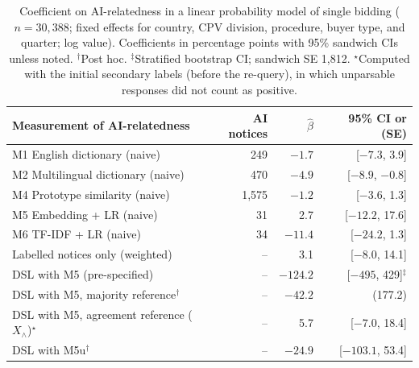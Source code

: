 \documentclass[runningheads]{llncs}
\begin{document}
\begin{table}[t]
\caption{Coefficient on AI-relatedness in a linear probability model of single bidding ($n=30{,}388$; fixed effects for country, CPV division, procedure, buyer type, and quarter; log value). Coefficients in percentage points with 95\% sandwich CIs unless noted. $^\dagger$Post hoc. $^\ddagger$Stratified bootstrap CI; sandwich SE 1,812. $^\star$Computed with the initial secondary labels (before the re-query), in which unparsable responses did not count as positive.}\label{tab:reg}
\centering
\begin{tabular}{lrrr}
\toprule
Measurement of AI-relatedness & AI notices & $\hat\beta$ & 95\% CI or (SE) \\
\midrule
M1 English dictionary (naive) & 249 & $-1.7$ & [$-7.3$, 3.9] \\
M2 Multilingual dictionary (naive) & 470 & $-4.9$ & [$-8.9$, $-0.8$] \\
M4 Prototype similarity (naive) & 1,575 & $-1.2$ & [$-3.6$, 1.3] \\
M5 Embedding + LR (naive) & 31 & 2.7 & [$-12.2$, 17.6] \\
M6 TF-IDF + LR (naive) & 34 & $-11.4$ & [$-24.2$, 1.3] \\
Labelled notices only (weighted) & -- & 3.1 & [$-8.0$, 14.1] \\
DSL with M5 (pre-specified) & -- & $-124.2$ & [$-495$, 429]$^\ddagger$ \\
DSL with M5, majority reference$^\dagger$ & -- & $-42.2$ & (177.2) \\
DSL with M5, agreement reference ($X_\wedge$)$^\star$ & -- & 5.7 & [$-7.0$, 18.4] \\
DSL with M5u$^\dagger$ & -- & $-24.9$ & [$-103.1$, 53.4] \\
\bottomrule
\end{tabular}
\end{table}
\end{document}
